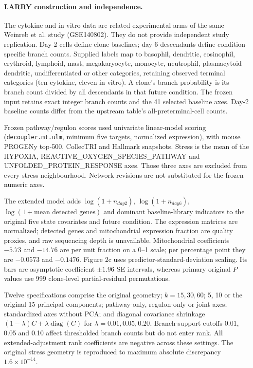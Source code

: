 \documentclass[a4paper,fleqn]{cas-sc}
\begin{document}
\paragraph{LARRY construction and independence.}
The cytokine and in vitro data are related experimental arms of the same Weinreb et al. study (GSE140802). They do not provide independent study replication. Day-2 cells define clone baselines; day-6 descendants define condition-specific branch counts. Supplied labels map to basophil, dendritic, eosinophil, erythroid, lymphoid, mast, megakaryocyte, monocyte, neutrophil, plasmacytoid dendritic, undifferentiated or other categories, retaining observed terminal categories (ten cytokine, eleven in vitro). A clone's branch probability is its branch count divided by all descendants in that future condition. The frozen input retains exact integer branch counts and the 41 selected baseline axes. Day-2 baseline counts differ from the upstream table's all-preterminal-cell counts.

Frozen pathway/regulon scores used univariate linear-model scoring (\texttt{decoupler.mt.ulm}, minimum five targets, normalized expression), with mouse PROGENy top-500, CollecTRI and Hallmark snapshots. Stress is the mean of the HYPOXIA, REACTIVE\_OXYGEN\_SPECIES\_PATHWAY and UNFOLDED\_PROTEIN\_RESPONSE axes. Those three axes are excluded from every stress neighbourhood. Network revisions are not substituted for the frozen numeric axes.

The extended model adds $\log(1+n_{day2})$, $\log(1+n_{day6})$, $\log(1+\text{mean detected genes})$ and dominant baseline-library indicators to the original five state covariates and future condition. The expression matrices are normalized; detected genes and mitochondrial expression fraction are quality proxies, and raw sequencing depth is unavailable. Mitochondrial coefficients $-5.73$ and $-14.76$ are per unit fraction on a 0--1 scale; per percentage point they are $-0.0573$ and $-0.1476$. Figure 2c uses predictor-standard-deviation scaling. Its bars are asymptotic coefficient $\pm1.96$ SE intervals, whereas primary original $P$ values use 999 clone-level partial-residual permutations.

Twelve specifications comprise the original geometry; $k=15,30,60$; 5, 10 or the original 15 principal components; pathway-only, regulon-only or joint axes; standardized axes without PCA; and diagonal covariance shrinkage $(1-\lambda)C+\lambda\operatorname{diag}(C)$ for $\lambda=0.01,0.05,0.20$. Branch-support cutoffs 0.01, 0.05 and 0.10 affect thresholded branch counts but do not enter rank. All extended-adjustment rank coefficients are negative across these settings. The original stress geometry is reproduced to maximum absolute discrepancy $1.6\times10^{-14}$.
\end{document}
